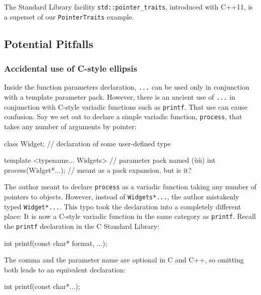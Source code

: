 \noindent The Standard Library facility \lstinline!std::pointer_traits!, introduced
with C++11, is a superset of our \lstinline!PointerTraits! example.

\subsection[Potential Pitfalls]{Potential Pitfalls}\label{potential-pitfalls-variadic}

\subsubsection[Accidental use of C-style ellipsis]{Accidental use of C-style ellipsis}\label{accidental-use-of-c-style-ellipsis}

Inside the function parameters declaration, \lstinline!...! can be used
only in conjunction with a template parameter pack. However, there is an
ancient use of \lstinline!...! in conjunction with C-style variadic
functions such as \lstinline!printf!. That use can cause confusion. Say we
set out to declare a simple variadic function, \lstinline!process!, that
takes any number of arguments by pointer:

\begin{emcppslisting}
class Widget;                   // declaration of some user-defined type

template <typename... Widgets>  // parameter pack named (ù{}ù)
int process(Widget*...);        // meant as a pack expansion, but is it?
\end{emcppslisting}
    

\noindent The author meant to declare \lstinline!process! as a variadic function
taking any number of pointers to objects. However, instead of
\lstinline!Widgets*...!, the author mistakenly typed \lstinline!Widget*...!.
This typo took the declaration into a completely different place: It is
now a C-style variadic function in the same category as \lstinline!printf!.
Recall the \lstinline!printf! declaration in the C Standard Library:

\begin{emcppslisting}
int printf(const char* format, ...);
\end{emcppslisting}
    

\noindent The comma and the parameter name are optional in C and C++, so omitting
both leads to an equivalent declaration:

\begin{emcppslisting}
int printf(const char*...);
\end{emcppslisting}
    

